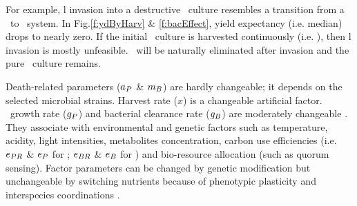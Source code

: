 \documentclass[../thesis.tex]{subfiles} %
\begin{document}
For example, \bac l invasion into a destructive \phy\ culture resembles a transition from a \PoN\ to \PBN\ system.  In Fig.\ref{f:ydByHarv} \& \ref{f:bacEffect}, yield expectancy (i.e. median) drops to nearly zero.  If the initial \phy\ culture is harvested continuously (i.e. \PoH), then \bac l invasion is mostly unfeasible.  \Bac\ will be naturally eliminated after invasion and the pure \phy\ culture remains.

Death-related parameters ($a_P$ \& $m_B$) are hardly changeable; it depends on the selected microbial strains.  Harvest rate ($x$) is a changeable artificial factor.  \Phy\ growth rate ($g_P$) and bacterial clearance rate ($g_B$) are moderately changeable \autocite{park2020potential}.  They associate with environmental and genetic factors such as temperature, acidity, light intensities, metabolites concentration, carbon use efficiencies (i.e. $e_{PR}$ \& $e_P$ for \phy; $e_{BR}$ \& $e_B$ for \bac) and bio-resource allocation (such as quorum sensing).  Factor parameters can be changed by genetic modification \autocite{moniruzzaman1996ethanol} but unchangeable by switching nutrients because of phenotypic plasticity \autocite{j1989respiration,bratbak1985phytoplankton,samejima1958heterotrophic} and interspecies coordinations \autocite{beliaev2014inference,amin2012interactions}.
\end{document}
